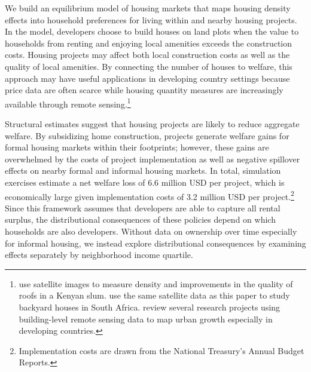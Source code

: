 \documentclass[12pt]{article}
\begin{document}
We build an equilibrium model of housing markets that maps housing density effects into household preferences for living within and nearby housing projects.  In the model, developers choose to build houses on land plots when the value to households from renting and enjoying local amenities exceeds the construction costs.  Housing projects may affect both local construction costs as well as the quality of local amenities.  By connecting the number of houses to welfare, this approach may have useful applications in developing country settings because price data are often scarce while housing quantity measures are increasingly available through remote sensing.\footnote{ \cite{marxthere} use satellite images to measure density and improvements in the quality of roofs in a Kenyan slum.  \cite{Brueckner2018backyarding} use the same satellite data as this paper to study backyard houses in South Africa. \cite{donaldson2016view} review several research projects using building-level remote sensing data to map urban growth especially in developing countries. }  

Structural estimates suggest that housing projects are likely to reduce aggregate welfare.  By subsidizing home construction, projects generate welfare gains for formal housing markets within their footprints; however, these gains are overwhelmed by the costs of project implementation as well as negative spillover effects on nearby formal and informal housing markets.  In total, simulation exercises estimate a net welfare loss of 6.6 million USD per project, which is economically large given implementation costs of 3.2 million USD per project.\footnote{Implementation costs are drawn from the National Treasury's Annual Budget Reports.}  Since this framework assumes that developers are able to capture all rental surplus, the distributional consequences of these policies depend on which households are also developers.  Without data on ownership over time especially for informal housing, we instead explore distributional consequences by examining effects separately by neighborhood income quartile.

\end{document}
